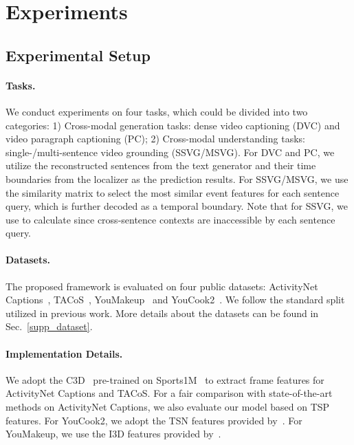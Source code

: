 \section{Experiments}
\subsection{Experimental Setup}


\paragraph{Tasks.} We conduct experiments on four tasks, which could be divided into two categories: 1) Cross-modal generation tasks: dense video captioning (DVC) and video paragraph captioning (PC); 2) Cross-modal understanding tasks: single-/multi-sentence video grounding (SSVG/MSVG). For DVC and PC, we utilize the reconstructed sentences from the text generator and their time boundaries from the localizer as the prediction results. For SSVG/MSVG, we use the similarity matrix  to select the most similar event features for each sentence query, which is further decoded as a temporal boundary. Note that for SSVG, we use  to calculate  since cross-sentence contexts are inaccessible by each sentence query.

\vspace{-1.0em}
\paragraph{Datasets.} The proposed framework is evaluated on four public datasets: ActivityNet Captions~\cite{krishna2017dense}, TACoS~\cite{regneri2013grounding}, YouMakeup~\cite{wang2019youmakeup} and YouCook2~\cite{zhou2018towards}. We follow the standard split utilized in previous work. More details about the datasets can be found in Sec.~\ref{supp_dataset}.



\vspace{-1.0em}
\paragraph{Implementation Details.}
We adopt the C3D~\cite{tran2015learning} pre-trained on Sports1M~\cite{karpathy2014large} to extract frame features for ActivityNet Captions and TACoS. For a fair comparison with state-of-the-art methods on ActivityNet Captions, we also evaluate our model based on TSP~\cite{wang2018temporal} features. For YouCook2, we adopt the TSN features provided by~\cite{zhou2018end}. For YouMakeup, we use the I3D features provided by~\cite{wang2019youmakeup}.

